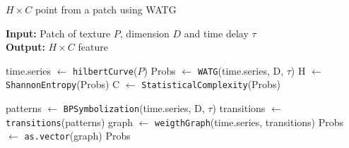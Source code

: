 \documentclass[journal]{IEEEtran}
\begin{document}
	\begin{algorithm}[h]
		\caption{$H \times C$ point from a patch using WATG}
		\label{alg:watg}                                
		\textbf{Input:} Patch of texture $P$, dimension $D$ and time delay \textbf{$\tau$}\\
		\textbf{Output:} $H \times C$ feature
		\begin{algorithmic}[1]
			\State time.series $\gets$ \texttt{hilbertCurve}($P$)
			\State Probs $\gets$ \texttt{WATG}(time.series, D, $\tau$)
			\State H $\gets$ \texttt{ShannonEntropy}(Probs)
			\State C $\gets$ \texttt{StatisticalComplexity}(Probs)
			
			\vspace{0.15cm}
			
			\State patterns $\gets$ \texttt{BPSymbolization}(time.series, D, $\tau$)
			\State transitions $\gets$ \texttt{transitions}(patterns)
			\State graph $\gets$ \texttt{weigthGraph}(time.series, transitions)
			\State Probs $\gets$ \texttt{as.vector}(graph)
			\State \Return Probs
			\EndFunction
		\end{algorithmic}
	\end{algorithm}
	
\end{document}
